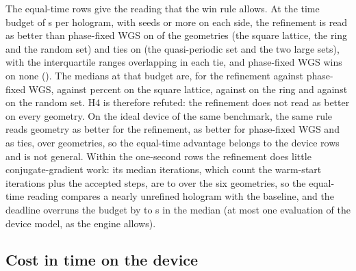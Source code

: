 The equal-time rows give the reading that the win rule allows. At the time budget of \benchOneTimeBudget{} s per hologram, with \benchOneWinMinSeeds{} seeds or more on each side, the refinement is read as better than phase-fixed WGS on \benchOneDevTimeProposed{} of the \benchOneDevCells{} geometries (the square lattice, the ring and the random set) and ties on \benchOneDevTimeTie{} (the quasi-periodic set and the two large sets), with the interquartile ranges overlapping in each tie, and phase-fixed WGS wins on none (\benchOneDevTimePublished{}). The medians at that budget are, for the refinement against phase-fixed WGS, \benchTimeSigRefGeoOne{} against \benchTimeSigMsevenGeoOne{} percent on the square lattice, \benchTimeSigRefGeoTwo{} against \benchTimeSigMsevenGeoTwo{} on the ring and \benchTimeSigRefGeoThree{} against \benchTimeSigMsevenGeoThree{} on the random set. H4 is therefore refuted: the refinement does not read as better on every geometry. On the ideal device of the same benchmark, the same rule reads \benchOneIdealTimeProposed{} geometry as better for the refinement, \benchOneIdealTimePublished{} as better for phase-fixed WGS and \benchOneIdealTimeTie{} as ties, over \benchOneIdealCells{} geometries, so the equal-time advantage belongs to the device rows and is not general. Within the one-second rows the refinement does little conjugate-gradient work: its median iterations, which count the \parWarm{} warm-start iterations plus the accepted steps, are \benchOneSecItersMin{} to \benchOneSecItersMax{} over the six geometries, so the equal-time reading compares a nearly unrefined hologram with the baseline, and the deadline overruns the budget by \benchOneSecOverrunMin{} to \benchOneSecOverrunMax{} s in the median (at most one evaluation of the device model, as the engine allows).

\subsection{Cost in time on the device}

